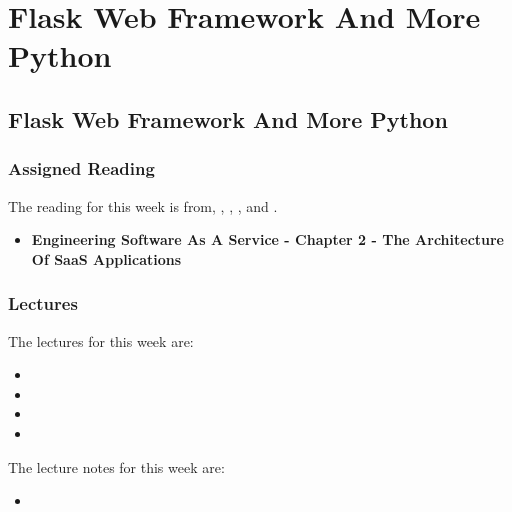 \clearpage

\renewcommand{\ChapTitle}{Flask Web Framework And More Python}
\renewcommand{\SectionTitle}{Flask Web Framework And More Python}

\chapter{\ChapTitle}

\section{\SectionTitle}

\subsection{Assigned Reading}

The reading for this week is from, \AgileBook, \EngSoftBook, \ProGitBook, and \LinuxBook.

\begin{itemize}
    \item \textbf{Engineering Software As A Service - Chapter 2 - The Architecture Of SaaS Applications}
\end{itemize}

\subsection{Lectures}

The lectures for this week are:

\begin{itemize}
    \item {}
    \item {}
    \item {}
    \item {}
\end{itemize}

\noindent The lecture notes for this week are:

\begin{itemize}
    \item {}
\end{itemize}

